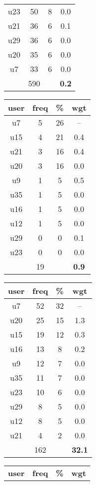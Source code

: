 \begin{appendices}
\begin{table}
\begin{tabular}{ |c|c|c|c| }
	u23 & 50 & 8 & 0.0 \\
	u21 & 36 & 6 & 0.1 \\
	u29 & 36 & 6 & 0.0 \\
	u20 & 35 & 6 & 0.0 \\
	u7 & 33 & 6 & 0.0 \\
	 & 590 & & \textbf{0.2} \\
	\hline
\end{tabular}
\begin{tabular}{ |c|c|c|c| }
	\hline
	\textbf{user} & \textbf{freq} & \textbf{\%} & \textbf{wgt} \\
	\hline
	u7 & 5 & 26 & -- \\
	u15 & 4 & 21 & 0.4 \\
	u21 & 3 & 16 & 0.4 \\
	u20 & 3 & 16 & 0.0 \\
	u9 & 1 & 5 & 0.5 \\
	u35 & 1 & 5 & 0.0 \\
	u16 & 1 & 5 & 0.0 \\
	u12 & 1 & 5 & 0.0 \\
	u29 & 0 & 0 & 0.1 \\
	u23 & 0 & 0 & 0.0 \\
	 & 19 & & \textbf{0.9} \\
	\hline
\end{tabular}
\begin{tabular}{ |c|c|c|c| }
	\hline
	\textbf{user} & \textbf{freq} & \textbf{\%} & \textbf{wgt} \\
	\hline
	u7 & 52 & 32 & -- \\
	u20 & 25 & 15 & 1.3 \\
	u15 & 19 & 12 & 0.3 \\
	u16 & 13 & 8 & 0.2 \\
	u9 & 12 & 7 & 0.0 \\
	u35 & 11 & 7 & 0.0 \\
	u23 & 10 & 6 & 0.0 \\
	u29 & 8 & 5 & 0.0 \\
	u12 & 8 & 5 & 0.0 \\
	u21 & 4 & 2 & 0.0 \\
	 & 162 & & \textbf{32.1} \\
	\hline
\end{tabular}
\begin{tabular}{ |c|c|c|c| }
	\hline
	\textbf{user} & \textbf{freq} & \textbf{\%} & \textbf{wgt} \\

\end{tabular}
\end{table}
\end{appendices}
